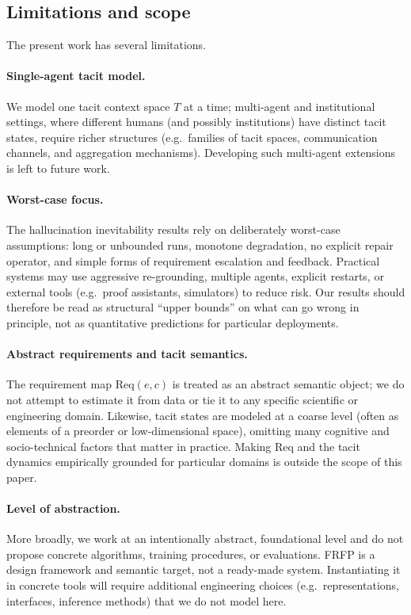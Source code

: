 \subsection{Limitations and scope}
\label{subsec:limitations}

The present work has several limitations.

\paragraph{Single-agent tacit model.}
We model one tacit context space $T$ at a time; multi-agent and institutional settings, where different humans (and possibly institutions) have distinct tacit states, require richer structures (e.g.\ families of tacit spaces, communication channels, and aggregation mechanisms). Developing such multi-agent extensions is left to future work.

\paragraph{Worst-case focus.}
The hallucination inevitability results rely on deliberately worst-case assumptions: long or unbounded runs, monotone degradation, no explicit repair operator, and simple forms of requirement escalation and feedback. Practical systems may use aggressive re-grounding, multiple agents, explicit restarts, or external tools (e.g.\ proof assistants, simulators) to reduce risk. Our results should therefore be read as structural ``upper bounds'' on what can go wrong in principle, not as quantitative predictions for particular deployments.

\paragraph{Abstract requirements and tacit semantics.}
The requirement map $\mathrm{Req}(e,c)$ is treated as an abstract semantic object; we do not attempt to estimate it from data or tie it to any specific scientific or engineering domain. Likewise, tacit states are modeled at a coarse level (often as elements of a preorder or low-dimensional space), omitting many cognitive and socio-technical factors that matter in practice. Making $\mathrm{Req}$ and the tacit dynamics empirically grounded for particular domains is outside the scope of this paper.

\paragraph{Level of abstraction.}
More broadly, we work at an intentionally abstract, foundational level and do not propose concrete algorithms, training procedures, or evaluations. FRFP is a design framework and semantic target, not a ready-made system. Instantiating it in concrete tools will require additional engineering choices (e.g.\ representations, interfaces, inference methods) that we do not model here.

